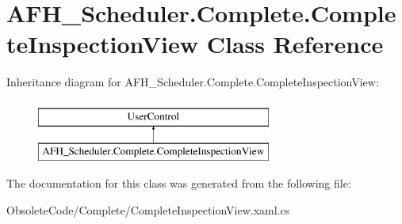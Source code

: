 \section{A\+F\+H\+\_\+\+Scheduler.\+Complete.\+Complete\+Inspection\+View Class Reference}
\label{class_a_f_h___scheduler_1_1_complete_1_1_complete_inspection_view}
Inheritance diagram for A\+F\+H\+\_\+\+Scheduler.\+Complete.\+Complete\+Inspection\+View\+:\begin{figure}[H]
\begin{center}
\leavevmode
\includegraphics[height=2.000000cm]{class_a_f_h___scheduler_1_1_complete_1_1_complete_inspection_view}
\end{center}
\end{figure}


The documentation for this class was generated from the following file\+:\begin{DoxyCompactItemize}
\item 
Obsolete\+Code/\+Complete/Complete\+Inspection\+View.\+xaml.\+cs\end{DoxyCompactItemize}

